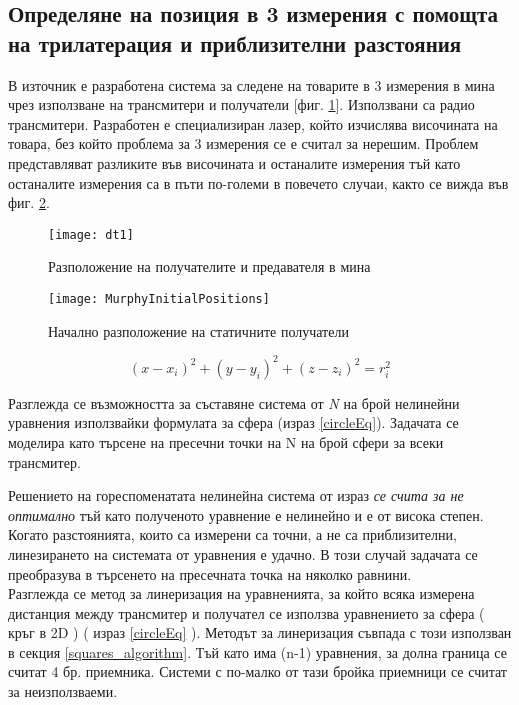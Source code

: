 \subsection{Определяне на позиция в 3 измерения с помощта на трилатерация и приблизителни разстояния}

В източник \cite{murphy} е разработена система за следене на товарите в 3 измерения в мина чрез използване на трансмитери и получатели [фиг. \ref{fig:mine}]. Използвани са радио трансмитери. Разработен е специализиран лазер, който изчислява височината на товара, без който проблема за 3 измерения се е считал за нерешим. Проблем представляват разликите във височината и останалите измерения тъй като останалите измерения са в пъти по-големи в повечето случаи, както се вижда във фиг. \ref{fig:initPos}.

\begin{figure}
    \centering
    \centerline{\texttt{[image: dt1]}}
    \caption{Разположение на получателите и предавателя в мина}
    \label{fig:mine}
\end{figure}

\begin{figure}
    \centering
    \centerline{\texttt{[image: MurphyInitialPositions]}}
    \caption{Начално разположение на статичните получатели}
    \label{fig:initPos}
\end{figure}


\begin{equation}\label{circleEq}
    (x-x_i)^2 + (y-y_i)^2 +(z-z_i)^2=r_i^2
\end{equation}

Разглежда се възможността за съставяне система от \textit{N} на брой нелинейни уравнения използвайки формулата за сфера (израз \ref{circleEq}). Задачата се моделира като търсене на пресечни точки на N на брой сфери за всеки трансмитер.

Решението на гореспоменатата нелинейна система от израз \emph{се счита за не оптимално} тъй като полученото уравнение е нелинейно и е от висока степен. Когато разстоянията, които са измерени са точни, а не са приблизителни, линезирането на системата от уравнения е удачно. В този случай задачата се преобразува в търсенето на пресечната точка на няколко равнини.  \\

Разглежда се метод за линеризация на уравненията, за който всяка измерена дистанция между трансмитер и получател се използва уравнението за сфера ( кръг в 2D ) ( израз \ref{circleEq} ). Методът за линеризация съвпада с този използван в секция \ref{squares_algorithm}. Тъй като има (n-1) уравнения, за долна граница се считат 4 бр. приемника. Системи с по-малко от тази бройка приемници се считат за неизползваеми.
\\

